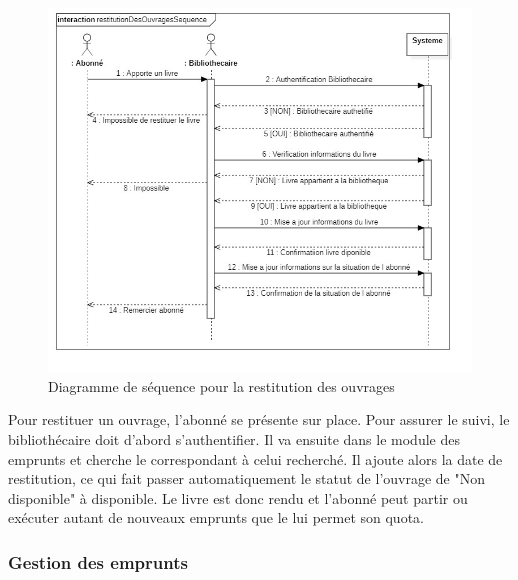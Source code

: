 \paragraph{}
\begin{figure}[h]
        \centering
        \includegraphics[width=1\textwidth]{restitutionDesOuvragesSequence}
        \caption{Diagramme de séquence pour la restitution des ouvrages}
        \label{image-restitutionDesOuvragesSequence}
        \end{figure}
\par
Pour restituer un ouvrage, l'abonné se présente sur place. Pour assurer le suivi, le 
bibliothécaire doit d'abord s'authentifier. Il va ensuite dans le module des emprunts 
et cherche le correspondant à celui recherché. Il ajoute alors la date de restitution,
ce qui fait passer automatiquement le statut de l'ouvrage de "Non disponible" à disponible.
Le livre est donc rendu et l'abonné peut partir ou exécuter autant de nouveaux emprunts
que le lui permet son quota.
\subsubsection{Gestion des emprunts} 
